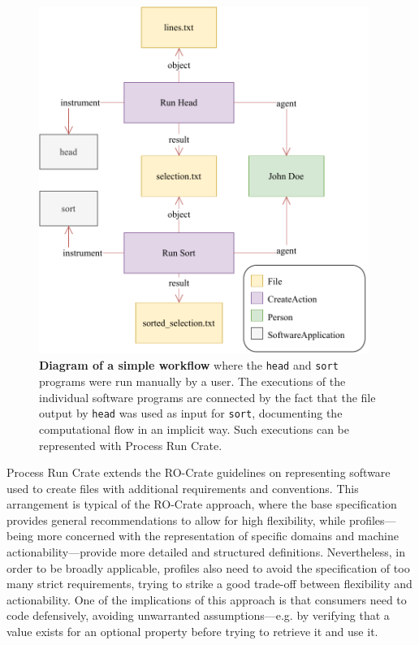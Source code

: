 \begin{figure}[htp]
\includegraphics[width=29em]{figures/ch54/wrroc-figure-example.drawio.pdf}
\caption[Diagram of a simple workflow]{{\bf Diagram of a simple workflow} where the \texttt{head} and \texttt{sort} programs were run manually by a user.
The executions of the individual software programs are connected by the fact that the file output by \texttt{head} was used as input for \texttt{sort}, documenting the computational flow in an implicit way.
Such executions can be represented with Process Run Crate.}
\label{ch54:fig:head_sort}
\end{figure}


Process Run Crate extends the RO-Crate guidelines on representing software used to create files with additional requirements and conventions.
This arrangement is typical of the RO-Crate approach, where the base specification provides general recommendations to allow for high flexibility, while profiles---being more concerned with the representation of specific domains and machine actionability---provide more detailed and structured definitions.
Nevertheless, in order to be broadly applicable, profiles also need to avoid the specification of too many strict requirements, trying to strike a good trade-off between flexibility and actionability.
One of the implications of this approach is that consumers need to code defensively, avoiding unwarranted assumptions---e.g. by verifying that a value exists for an optional property before trying to retrieve it and use it.


